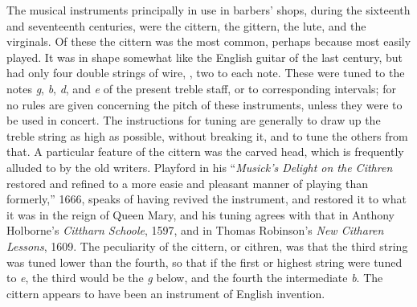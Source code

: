 The musical instruments principally in use in barbers’ shops, during the
sixteenth and seventeenth centuries, were the cittern, the gittern, the lute, and
the virginals. Of these the cittern was the most common, perhaps because most
easily played. It was in shape somewhat like the English guitar of the last
century, but had only four double strings of wire, \ie, two to each note.
These
were tuned to the notes \textit{g}, \textit{b}, \textit{d}, and \textit{e} of the present treble staff, or to corresponding
intervals; for no rules are given concerning the pitch of these instruments,
unless they were to be used in concert. The instructions for tuning are generally
to draw up the treble string as high as possible, without breaking it, and to tune
the others from that. A particular feature of the cittern was the carved head,
which is frequently alluded to by the old writers.
 Playford in his “\textit{Musick’s
Delight on the Cithren} restored and refined to a more easie and pleasant manner of
playing than formerly,” 1666, speaks of having revived the instrument, and restored
it to what it was in the reign of Queen Mary, and his tuning agrees with
that in Anthony Holborne’s \textit{Cittharn Schoole}, 1597, and in Thomas Robinson’s \textit{New
Citharen Lessons}, 1609. The peculiarity of the cittern, or cithren, was that the
third string was tuned lower than the fourth, so that if the first or highest string
were tuned to \textit{e}, the third would be the \textit{g} below, and the fourth the intermediate \textit{b}.
The cittern appears to have been an instrument of English invention.

